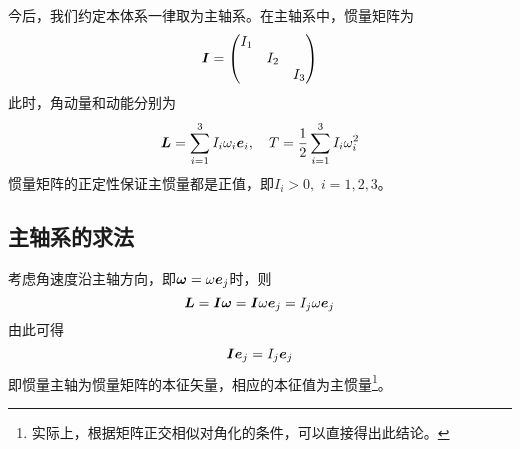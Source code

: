 今后，我们约定本体系一律取为主轴系。在主轴系中，惯量矩阵为
\begin{equation*}
	\boldsymbol{I} = \begin{pmatrix} I_1 & & \\ & I_2 & \\ & & I_3 \end{pmatrix}
\end{equation*}
此时，角动量和动能分别为
\begin{equation*}
	\boldsymbol{L} = \sum_{i=1}^3 I_i \omega_i \boldsymbol{e}_i,\quad T = \frac12 \sum_{i=1}^3 I_i \omega_i^2
\end{equation*}
惯量矩阵的正定性保证主惯量都是正值，即$I_i>0,\,\,i=1,2,3$。

\subsection{主轴系的求法}

考虑角速度沿主轴方向，即$\boldsymbol{\omega} = \omega \boldsymbol{e}_j$时，则
\begin{equation*}
	\boldsymbol{L} = \boldsymbol{I} \boldsymbol{\omega} = \boldsymbol{I} \omega \boldsymbol{e}_j = I_j \omega \boldsymbol{e}_j
\end{equation*}
由此可得
\begin{equation*}
	\boldsymbol{I} \boldsymbol{e}_j = I_j \boldsymbol{e}_j
\end{equation*}
即惯量主轴为惯量矩阵的本征矢量，相应的本征值为主惯量\footnote{实际上，根据矩阵正交相似对角化的条件，可以直接得出此结论。}。

